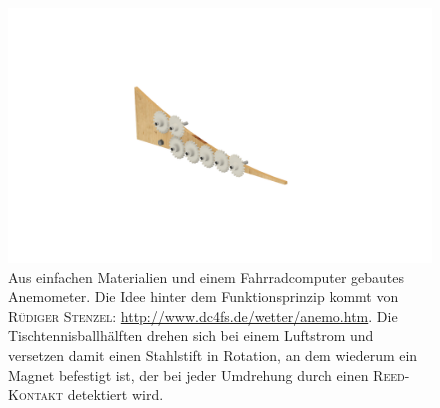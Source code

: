 \begin{figure}[htbp]
\vspace*{0.2cm}
\centering
 \includegraphics[width=1.7\textwidth]{images/rampprint1.png}
  \caption[Draufsicht der gebauten Rampe]{Aus einfachen Materialien und einem Fahrradcomputer gebautes Anemometer. Die Idee hinter dem Funktionsprinzip kommt von \textsc{Rüdiger Stenzel}: \url{http://www.dc4fs.de/wetter/anemo.htm}. Die Tischtennisballhälften drehen sich bei einem Luftstrom und versetzen damit einen Stahlstift in Rotation, an dem wiederum ein Magnet befestigt ist, der bei jeder Umdrehung durch einen \textsc{Reed-Kontakt} detektiert wird.}
  \label{fig:isoautodesk}
  \vspace{-0pt}
\end{figure}